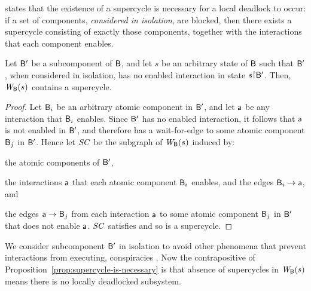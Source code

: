  states that the existence of a supercycle is necessary for a local deadlock to occur: if a set of components,
\emph{considered in isolation}, are blocked, then there exists a supercycle consisting of exactly those components, together with the interactions
that each component enables.
%
\begin{proposition}
\label{prop:static:supercycle-is-necessary} 
\label{prop:supercycle-is-necessary}
Let $\mathsf{B}'$ be a subcomponent of $\mathsf{B}$, and let $s$ be an arbitrary state of $\mathsf{B}$ such that $\mathsf{B}'$, when considered in isolation, has no enabled
interaction in state $s \pj \B'$.
%
Then, $\mathit{W}_{\mathsf{B}}({s})$ contains a supercycle.
\end{proposition}
%
%
\begin{proof}
Let $\mathsf{B}_i$ be an arbitrary atomic component in $\mathsf{B}'$, and let $\mathsf{a}$ be any interaction that $\mathsf{B}_i$ enables. Since $\mathsf{B}'$ has no
enabled interaction, it follows that $\mathsf{a}$ is not enabled in $\mathsf{B}'$, and
therefore has a wait-for-edge to some atomic component $\mathsf{B}_j$ in
$\mathsf{B}'$. Hence let $\mathit{SC}$ be the subgraph of $\mathit{W}_{\mathsf{B}}({s})$ induced by:
\bn
\item the atomic components of $\mathsf{B}'$, 
\item the interactions $\mathsf{a}$ that each atomic component $\mathsf{B}_i$ enables,
     and the edges $\mathsf{B}_i \rightarrow \mathsf{a}$, and
\item  the edges $\mathsf{a} \rightarrow \mathsf{B}_j$ from each interaction $\mathsf{a}$ to some atomic
     component $\mathsf{B}_j$ in $\mathsf{B}'$ that does not enable $\mathsf{a}$.
\en
$\mathit{SC}$ satisfies  and so is a supercycle.
\end{proof}

We consider subcomponent $\mathsf{B}'$ in isolation to avoid other phenomena that prevent interactions from executing, \eg
conspiracies \cite{AFG93}.  
Now the contrapositive of Proposition~\ref{prop:supercycle-is-necessary} is that absence of
supercycles in $\mathit{W}_{\mathsf{B}}({s})$ means there is no locally deadlocked subsystem. 



